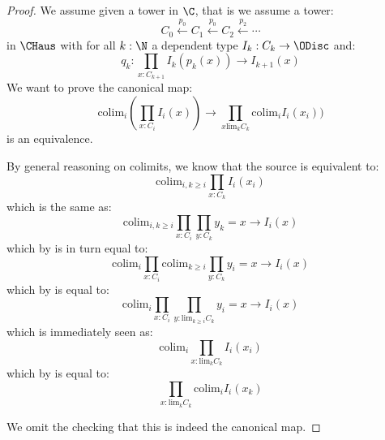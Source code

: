 \begin{proof}
We assume given a tower in $\C$, that is we assume a tower:
\[C_0 \overset{p_0}{\leftarrow} C_1 \overset{p_0}{\leftarrow} C_2 \overset{p_2}{\leftarrow}\cdots \]
in $\CHaus$ with for all $k:\N$ a dependent type $I_k:C_k\to \ODisc$ and:
\[q_k : \prod_{x:C_{k+1}}I_k(p_k(x))\to I_{k+1}(x)\]
We want to prove the canonical map:
\[\mathrm{colim}_i (\prod_{x:C_i}I_i(x)) \to \prod_{x\mathrm{lim}_kC_k}\mathrm{colim}_i I_i(x_i))\]
is an equivalence. 

By general reasoning on colimits, we know that the source is equivalent to:
\[\mathrm{colim}_{i,k\geq i} \prod_{x:C_k} I_i(x_i)\]
which is the same as:
\[\mathrm{colim}_{i,k\geq i} \prod_{x:C_i}\prod_{y:C_k} y_k=x \to I_i(x)\]
which by  is in turn equal to:
\[\mathrm{colim}_i\prod_{x:C_i} \mathrm{colim}_{k\geq i} \prod_{y:C_k} y_i = x \to I_i(x)\]
which by  is equal to:
\[\mathrm{colim}_i\prod_{x:C_i} \prod_{y:\mathrm{lim}_{k\geq i} C_k} y_i=x \to I_i(x)\]
which is immediately seen as:
\[\mathrm{colim}_i\prod_{x:\mathrm{lim}_{k} C_k} I_i(x_i)\]
which by  is equal to:
\[\prod_{x:\mathrm{lim}_{k} C_k} \mathrm{colim}_i I_i(x_k)\]

We omit the checking that this is indeed the canonical map.
\end{proof}

